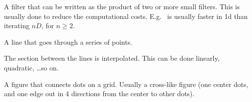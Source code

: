 \begin{definition}
    A filter that can be written as the product of two or more small filters.
    This is usually done to reduce the computational costs.
    E.g.~ is usually faster in 1d than iterating $nD$, for
    $n \ge 2$.
\end{definition}

\begin{definition}[Spline]
    A line that goes through a series of points.

    The section between the lines is interpolated. This can be done linearly,
    quadratic, \dots so on.
\end{definition}

\begin{definition}[Stencil]
    A figure that connects dots on a grid. Usually a cross-like figure 
    (one center dots, and one edge out in 4 directions from the center to
    other dots).
\end{definition}
